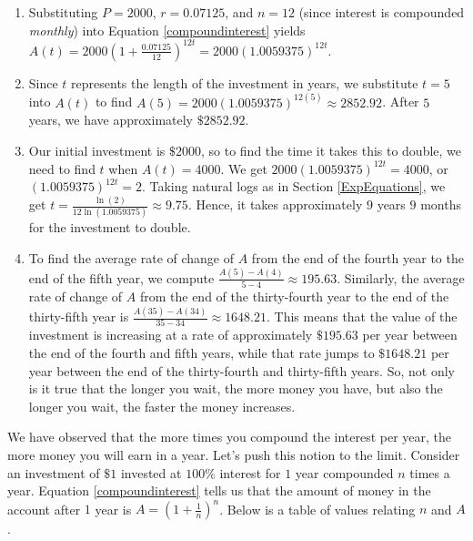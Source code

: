 {
\begin{enumerate}

\item  Substituting $P = 2000$, $r = 0.07125$, and $n = 12$ (since interest is compounded \textit{monthly}) into Equation \ref{compoundinterest} yields $A(t) = 2000\left(1 + \frac{0.07125}{12}\right)^{12t}=2000 (1.0059375)^{12t}$.

\item  Since $t$ represents the length of the investment in years, we substitute $t=5$ into $A(t)$ to find $A(5) = 2000 (1.0059375)^{12(5)} \approx 2852.92$.  After $5$ years, we have approximately $\$2852.92$.

\item  Our initial investment is $\$2000$, so to find the time it takes this to double, we need to find $t$ when $A(t) = 4000$.  We get $2000 (1.0059375)^{12t}=4000$, or $(1.0059375)^{12t}=2$.  Taking natural logs as in Section \ref{ExpEquations}, we get $t = \frac{\ln(2)}{12 \ln(1.0059375)} \approx 9.75$.  Hence, it takes approximately $9$ years $9$ months for the investment to double.

\item  To find the average rate of change of $A$ from the end of the fourth year to the end of the fifth year, we compute $\frac{A(5)-A(4)}{5-4} \approx 195.63$.  Similarly, the average rate of change of $A$ from the end of the thirty-fourth year to the end of the thirty-fifth year is $\frac{A(35)-A(34)}{35-34} \approx 1648.21$.  This means that the value of the investment is increasing at a rate of approximately $\$195.63$ per year between the end of the fourth and fifth years, while that rate jumps to $\$1648.21$ per year between the end of the thirty-fourth and thirty-fifth years.  So, not only is it true that the longer you wait, the more money you have, but also the longer you wait, the faster the money increases.

\end{enumerate}
}

\medskip

We have observed that the more times you compound the interest per year, the more money you will earn in a year.  Let's push this notion to the limit.   Consider an investment of $\$ 1$ invested at $100 \%$ interest for $1$ year compounded $n$ times a year.  Equation \ref{compoundinterest} tells us that the amount of money in the account after $1$ year is $A = \left(1+\frac{1}{n}\right)^{n}$.  Below is a table of values relating $n$ and $A$.

